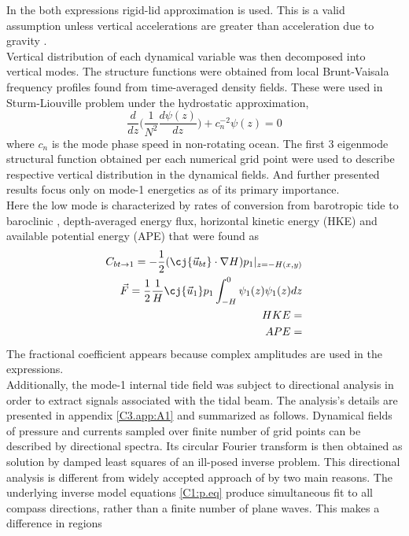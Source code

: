 \documentclass[12pt]{article}
\begin{document}
In the both expressions rigid-lid approximation is used. This is a valid assumption unless 
vertical accelerations are greater than acceleration due to gravity \citep{kelly2010}.\\
Vertical distribution of each dynamical variable was then decomposed into vertical modes. The 
structure functions were 
obtained from local Brunt-Vaisala frequency profiles found from time-averaged density fields. 
These were used in Sturm-Liouville problem under the hydrostatic approximation,
\begin{equation}
\frac{d}{dz}\Big( \frac{1}{N^2}  \frac{d \psi(z)}{dz}\Big) + c^{-2}_n \psi(z) 
= 0
\end{equation}
where $c_n$ is the mode phase speed in non-rotating ocean. The first 3 eigenmode structural 
function obtained per each numerical grid point were used to describe respective vertical 
distribution in the dynamical fields. And further presented results focus only on mode-1 energetics 
as of its primary importance.\\
Here the low mode is characterized by rates of conversion from barotropic tide to baroclinic 
\citep{simmons2004internal, kurapov2003m}, depth-averaged energy flux, horizontal kinetic energy 
(HKE) and available potential energy (APE) that were found as
\begin{align}
C_{bt\to 1} = -\frac{1}{2}(\cj{\vec{u}_{bt}} \cdot \nabla H) p_{1}|_{z = -H(x,y)}\\
\vec{F} = \frac{1}{2} \frac{1}{H} \cj{\vec{u}_1} p_1 \int_{-H}^{0} \psi_1(z) \psi_1(z) dz\\
HKE = \\
APE = 
\end{align}
The fractional coefficient appears because complex amplitudes are used in the expressions.\\
Additionally, the mode-1 internal tide field was subject to directional analysis in order to 
extract signals associated with the tidal beam. The analysis's details are presented in 
appendix \ref{C3.app:A1} and summarized as follows. Dynamical fields of pressure and currents 
sampled over 
finite number of grid points can be described by directional spectra. Its circular 
Fourier transform is then obtained as solution by damped least squares of an ill-posed inverse 
problem. This directional analysis is 
different from widely accepted approach of \cite{zhao2010long} by two main reasons. The underlying 
inverse model equations \eqref{C1:p.eq} produce simultaneous fit to all 
compass 
directions, rather than a finite number of plane waves. This makes a difference in regions 
\end{document}
